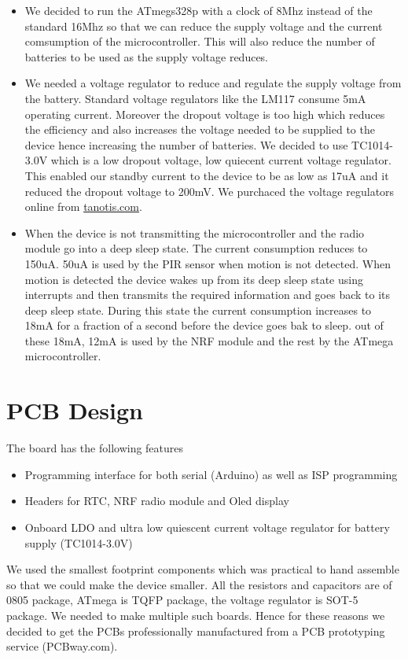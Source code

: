 \begin{itemize}
\item We decided to run the ATmegs328p with a clock of 8Mhz instead of the standard 16Mhz so that we can reduce the supply voltage and the current comsumption of the microcontroller. This will also reduce the number of batteries to be used as the supply voltage reduces.
\item We needed a voltage regulator to reduce and regulate the supply voltage from the battery. Standard voltage regulators like the LM117 consume 5mA operating current. Moreover the dropout voltage is too high which reduces the efficiency and also increases the voltage needed to be supplied to the device hence increasing the number of batteries.
We decided to use TC1014-3.0V which is a low dropout voltage, low quiecent current voltage regulator. This enabled our standby current to the device to be as low as 17uA and it reduced the dropout voltage to 200mV.
We purchaced the voltage regulators online from \url{tanotis.com}.
\item When the device is not transmitting the microcontroller and the radio module go into a deep sleep state. The current consumption reduces to 150uA. 50uA is used by the PIR sensor when motion is not detected. 
When motion is detected the device wakes up from its deep sleep state using interrupts and then transmits the required information and goes back to its deep sleep state. During this state the current consumption increases to 18mA for a fraction of a second before the device goes bak to sleep. out of these 18mA, 12mA is used by the NRF module and the rest by the ATmega microcontroller.
\end{itemize}

\section{PCB Design}
The board has the following features
\begin{itemize}
	\item Programming interface for both serial (Arduino) as well as ISP programming
	\item Headers for RTC, NRF radio module and Oled display
	\item Onboard LDO and ultra low quiescent current voltage regulator for battery supply (TC1014-3.0V)
\end{itemize}

We used the smallest footprint components which was practical to hand assemble so that we could make the device smaller. All the resistors and capacitors are of 0805 package, ATmega is TQFP package, the voltage regulator is SOT-5 package.
We needed to make multiple such boards.
Hence for these reasons we decided to get the PCBs professionally manufactured from a PCB prototyping service (PCBway.com).

